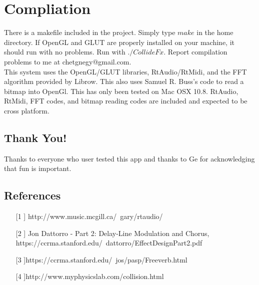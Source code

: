 \documentclass[pdftext,twoside,10pt]{article}
\begin{document}
\vspace{1cm}

\section{Compliation}
There is a makefile included in the project. Simply type $make$ in the home directory. If OpenGL and GLUT are properly installed on your machine, it should run with no problems. Run with $./CollideFx$. Report compilation problems to me at chetgnegy@gmail.com.\\

This system uses the OpenGL/GLUT libraries, RtAudio/RtMidi, and the FFT algorithm provided by Librow. This also uses Samuel R. Buss's code to read a bitmap into OpenGl. This has only been tested on Mac OSX 10.8. RtAudio, RtMidi, FFT codes, and bitmap reading codes are included and expected to be cross platform.

\vspace{1cm}


\subsection*{Thank You!}
Thanks to everyone who user tested this app and thanks to Ge for acknowledging that fun is important.

\vspace{1cm}


\subsection*{References}

\begin{enumerate}
\item[[1]] http://www.music.mcgill.ca/~gary/rtaudio/
\item[[2]] Jon Dattorro - Part 2: Delay-Line Modulation and Chorus,  
https://ccrma.stanford.edu/~dattorro/EffectDesignPart2.pdf 
\item[[3]]https://ccrma.stanford.edu/~jos/pasp/Freeverb.html 
\item[[4]]http://www.myphysicslab.com/collision.html
\end{enumerate}
\end{document}
